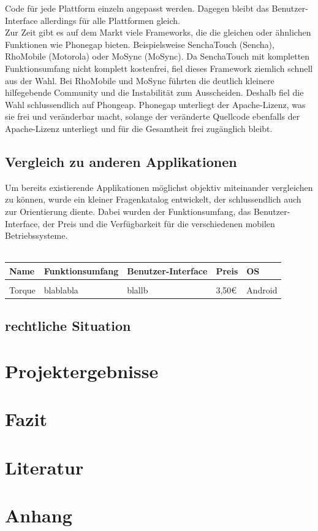 \documentclass[4paper,10pt]{article}
\begin{document}
Code für jede Plattform einzeln angepasst werden. Dagegen bleibt das
Benutzer-Interface allerdings für alle Plattformen gleich. \\
Zur Zeit gibt es auf dem Markt viele Frameworks, die die gleichen oder ähnlichen
Funktionen wie Phonegap bieten. Beispielsweise SenchaTouch (Sencha), RhoMobile
(Motorola) oder MoSync (MoSync). Da SenchaTouch mit kompletten Funktionsumfang
nicht komplett kostenfrei, fiel dieses Framework ziemlich schnell aus der Wahl.
Bei RhoMobile und MoSync führten die deutlich kleinere hilfegebende Community
und die Instabilität zum Ausscheiden. Deshalb fiel die Wahl schlussendlich auf
Phongeap. Phonegap unterliegt der Apache-Lizenz, was sie frei und veränderbar
macht, solange der veränderte Quellcode ebenfalls der Apache-Lizenz unterliegt
und für die Gesamtheit frei zugänglich bleibt.



\subsection{Vergleich zu anderen Applikationen}
Um bereits existierende Applikationen möglichst objektiv miteinander vergleichen
zu können, wurde ein kleiner Fragenkatalog entwickelt, der schlussendlich auch
zur Orientierung diente. Dabei wurden der Funktionsumfang, das
Benutzer-Interface, der Preis und die Verfügbarkeit für die verschiedenen
mobilen Betriebssysteme.
\\ 


\begin{tabular}{ l | l | p{5cm} | l | l}

Name & Funktionsumfang & Benutzer-Interface & Preis & OS \\
\hline
\\
Torque&  blablabla& blallb & 3,50€ & Android \\


\end{tabular}



\subsection{rechtliche Situation}
\newpage


\section{Projektergebnisse}
\newpage

\section{Fazit}
\newpage





\setcounter{section}{5} 
\renewcommand{\thesection}{\Roman{section}}

\section{\hspace{0.2cm}Literatur}
\newpage

\section{\hspace{0.1cm}Anhang}
\newpage
\end{document}
